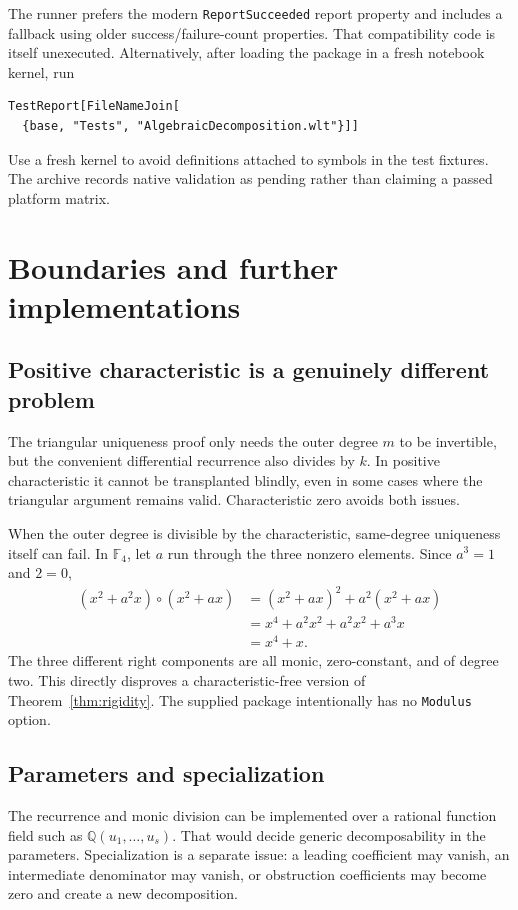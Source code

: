 \documentclass[11pt,letterpaper]{article}
\theoremstyle{definition}
\theoremstyle{remark}
\newcommand{\Q}{\mathbb Q}
\newcommand{\wt}[1]{\texttt{#1}}
\begin{document}
The runner prefers the modern \wt{ReportSucceeded} report property and
includes a fallback using older success/failure-count properties. That
compatibility code is itself unexecuted. Alternatively, after loading the
package in a fresh notebook kernel, run
\begin{lstlisting}
TestReport[FileNameJoin[
  {base, "Tests", "AlgebraicDecomposition.wlt"}]]
\end{lstlisting}
Use a fresh kernel to avoid definitions attached to symbols in the test
fixtures. The archive records native validation as pending rather than
claiming a passed platform matrix.

\section{Boundaries and further implementations}
\label{sec:extensions}

\subsection{Positive characteristic is a genuinely different problem}
The triangular uniqueness proof only needs the outer degree $m$ to be
invertible, but the convenient differential recurrence also divides by
$k$. In positive characteristic it cannot be transplanted blindly, even
in some cases where the triangular argument remains valid. Characteristic
zero avoids both issues.

When the outer degree is divisible by the characteristic, same-degree
uniqueness itself can fail. In $\mathbb F_4$, let $a$ run through the
three nonzero elements. Since $a^3=1$ and $2=0$,
\begin{align*}
 (x^2+a^2x)\circ(x^2+ax)
 &=(x^2+ax)^2+a^2(x^2+ax)\\
 &=x^4+a^2x^2+a^2x^2+a^3x\\
 &=x^4+x.
\end{align*}
The three different right components are all monic, zero-constant, and
of degree two. This directly disproves a characteristic-free version of
Theorem~\ref{thm:rigidity}. The supplied package intentionally has no
\wt{Modulus} option.

\subsection{Parameters and specialization}
The recurrence and monic division can be implemented over a rational
function field such as $\Q(u_1,\ldots,u_s)$. That would decide generic
decomposability in the parameters. Specialization is a separate issue:
a leading coefficient may vanish, an intermediate denominator may vanish,
or obstruction coefficients may become zero and create a new decomposition.
\end{document}
